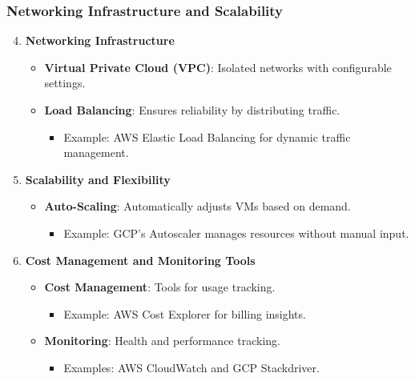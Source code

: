 \documentclass[aspectratio=169]{beamer}
\begin{document}
\begin{frame}[fragile]
    \frametitle{Networking Infrastructure and Scalability}
    \begin{enumerate}
        \setcounter{enumi}{3}
        \item \textbf{Networking Infrastructure}
        \begin{itemize}
            \item \textbf{Virtual Private Cloud (VPC)}: Isolated networks with configurable settings.
            \item \textbf{Load Balancing}: Ensures reliability by distributing traffic.
            \begin{itemize}
                \item Example: AWS Elastic Load Balancing for dynamic traffic management.
            \end{itemize}
        \end{itemize}

        \item \textbf{Scalability and Flexibility}
        \begin{itemize}
            \item \textbf{Auto-Scaling}: Automatically adjusts VMs based on demand.
            \begin{itemize}
                \item Example: GCP's Autoscaler manages resources without manual input.
            \end{itemize}
        \end{itemize}

        \item \textbf{Cost Management and Monitoring Tools}
        \begin{itemize}
            \item \textbf{Cost Management}: Tools for usage tracking.
            \begin{itemize}
                \item Example: AWS Cost Explorer for billing insights.
            \end{itemize}
            \item \textbf{Monitoring}: Health and performance tracking.
            \begin{itemize}
                \item Examples: AWS CloudWatch and GCP Stackdriver.
            \end{itemize}
        \end{itemize}
    \end{enumerate}
\end{frame}
\end{document}
